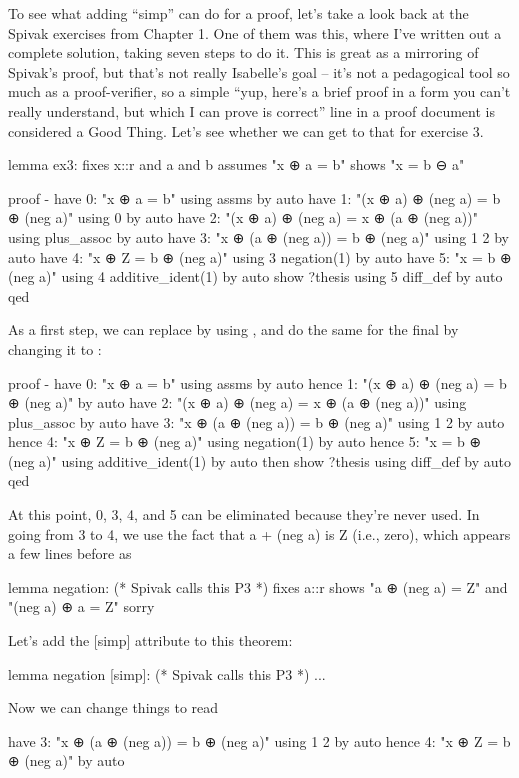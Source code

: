 To see what adding ``simp'' can do for a proof, let's take a look back at the Spivak exercises from Chapter 1. One of them was this, where I've written out a complete solution, taking seven steps to do it. This is great as a mirroring of Spivak's proof, but that's not really Isabelle's goal -- it's not a pedagogical tool so much as a proof-verifier, so a simple ``yup, here's a brief proof in a form you can't really understand, but which I can prove is correct'' line in a proof document is considered a Good Thing. Let's see whether we can get to that for exercise 3. 
\begin{IS}
    
lemma ex3: 
  fixes x::r and a and b
  assumes "x ⊕ a = b"
  shows "x = b ⊖ a"

proof -
  have 0: "x ⊕ a = b" using assms by auto
  have 1: "(x ⊕ a) ⊕ (neg a) = b ⊕ (neg a)" using 0 by auto
  have 2: "(x ⊕ a) ⊕ (neg a) = x ⊕ (a ⊕ (neg a))" using plus_assoc by auto
  have 3: "x ⊕ (a ⊕ (neg a)) = b ⊕ (neg a)" using 1 2 by auto
  have 4: "x ⊕ Z = b ⊕ (neg a)" using 3 negation(1) by auto
  have 5: "x = b ⊕ (neg a)" using 4 additive_ident(1) by auto
  show ?thesis using 5 diff_def by auto
qed
\end{IS}

As a first step, we can replace  by using , and do the same for the final  by changing it to :
\begin{IS}
    
proof -
  have 0: "x ⊕ a = b" using assms by auto
  hence 1: "(x ⊕ a) ⊕ (neg a) = b ⊕ (neg a)" by auto
  have 2: "(x ⊕ a) ⊕ (neg a) = x ⊕ (a ⊕ (neg a))" using plus_assoc by auto
  have 3: "x ⊕ (a ⊕ (neg a)) = b ⊕ (neg a)" using 1 2 by auto
  hence 4: "x ⊕ Z = b ⊕ (neg a)" using negation(1) by auto
  hence 5: "x = b ⊕ (neg a)" using additive_ident(1) by auto
  then show ?thesis using diff_def by auto
qed
\end{IS}

At this point, 0, 3, 4, and 5 can be eliminated because they're never used. In going from 3 to 4, we use the fact that a + (neg a) is Z (i.e., zero), which appears a few lines before as 
\begin{IS}
lemma  negation: (* Spivak calls this P3 *)
  fixes a::r
  shows "a ⊕ (neg a) =  Z"
  and  "(neg a) ⊕ a =  Z"
  sorry
\end{IS}

Let's add the [simp] attribute to this theorem:

\begin{IS}
lemma  negation [simp]: (* Spivak calls this P3 *)
...
\end{IS}
Now we can change things to read
\begin{IS}
have 3: "x ⊕ (a ⊕ (neg a)) = b ⊕ (neg a)" using 1 2 by auto
hence 4: "x ⊕ Z = b ⊕ (neg a)" by auto
\end{IS}

